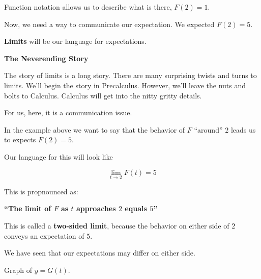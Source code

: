 \documentclass{ximera}
\begin{document}
Function notation allows us to describe what is there, $F(2) = 1$. 

Now, we need a way to communicate our expectation.  We expected $F(2) = 5$. 






\textbf{\textcolor{purple!85!blue}{Limits}} will be our language for expectations. 

\begin{warning} \textbf{\textcolor{red!70!black}{The Neverending Story}}


The story of limits is a long story.  There are many surprising twists and turns to limits. We'll begin the story in Precalculus.  However, we'll leave the nuts and bolts to Calculus. Calculus will get into the nitty gritty details. 

For us, here, it is a communication issue.
\end{warning}






\begin{idea}

In the example above we want to say that the behavior of $F$ ``around'' $2$ leads us to expects $F(2)=5$.

Our language for this will look like

\[   \lim\limits_{t \to 2} F(t) = 5\]


This is propnounced as: 


\begin{center}
\textbf{\textcolor{red!70!black}{``The limit of $F$ as $t$ approaches $2$ equals $5$''}}
\end{center}



\end{idea}






This is called a \textbf{\textcolor{purple!85!blue}{two-sided limit}}, because the behavior on either side of $2$ conveys an expectation of $5$. 





We have seen that our expectations may differ on either side. 







Graph of $y = G(t)$.
\end{document}
